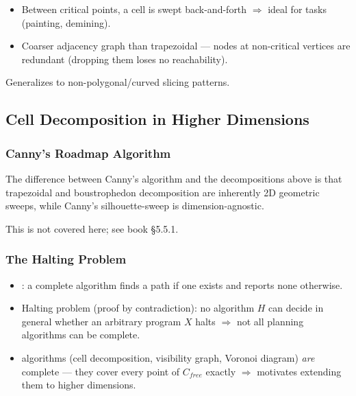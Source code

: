 
\begin{itemize}
\item Between critical points, a cell is swept back-and-forth $\Rightarrow$ ideal for  tasks (painting, demining).
\item Coarser adjacency graph than trapezoidal — nodes at non-critical vertices are redundant (dropping them loses no reachability).
\end{itemize}

Generalizes to non-polygonal/curved slicing patterns.


\begin{democallout}
\end{democallout}

\subsection{Cell Decomposition in Higher Dimensions}

\subsubsection{Canny's Roadmap Algorithm}
The difference between Canny's algorithm and the decompositions above is that trapezoidal and boustrophedon decomposition are inherently 2D geometric sweeps, while Canny's silhouette-sweep is dimension-agnostic. 

This is not covered here; see book \S5.5.1.

\subsubsection{The Halting Problem}
\begin{itemize}
\item {}: a complete algorithm finds a path if one exists and reports none otherwise.
\item Halting problem (proof by contradiction): no algorithm $H$ can decide in general whether an arbitrary program $X$ halts $\Rightarrow$ not all planning algorithms can be complete.
\item {} algorithms (cell decomposition, visibility graph, Voronoi diagram) \emph{are} complete — they cover every point of $C_{free}$ exactly $\Rightarrow$ motivates extending them to higher dimensions.
\end{itemize}

